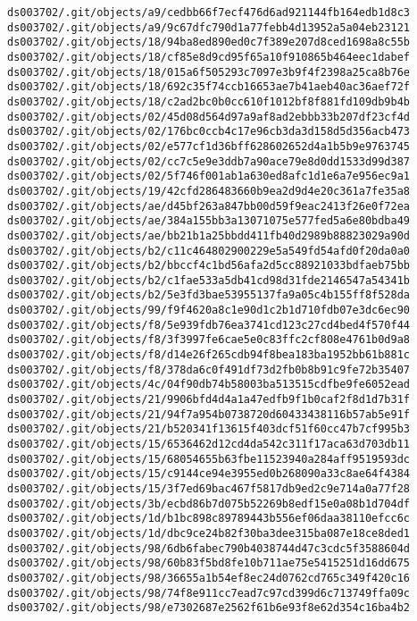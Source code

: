 \documentclass[11pt]{article}
\begin{document}
\begin{Verbatim}[commandchars=\\\{\}]
ds003702/.git/objects/a9/cedbb66f7ecf476d6ad921144fb164edb1d8c3
ds003702/.git/objects/a9/9c67dfc790d1a77febb4d13952a5a04eb23121
ds003702/.git/objects/18/94ba8ed890ed0c7f389e207d8ced1698a8c55b
ds003702/.git/objects/18/cf85e8d9cd95f65a10f910865b464eec1dabef
ds003702/.git/objects/18/015a6f505293c7097e3b9f4f2398a25ca8b76e
ds003702/.git/objects/18/692c35f74ccb16653ae7b41aeb40ac36aef72f
ds003702/.git/objects/18/c2ad2bc0b0cc610f1012bf8f881fd109db9b4b
ds003702/.git/objects/02/45d08d564d97a9af8ad2ebbb33b207df23cf4d
ds003702/.git/objects/02/176bc0ccb4c17e96cb3da3d158d5d356acb473
ds003702/.git/objects/02/e577cf1d36bff628602652d4a1b5b9e9763745
ds003702/.git/objects/02/cc7c5e9e3ddb7a90ace79e8d0dd1533d99d387
ds003702/.git/objects/02/5f746f001ab1a630ed8afc1d1e6a7e956ec9a1
ds003702/.git/objects/19/42cfd286483660b9ea2d9d4e20c361a7fe35a8
ds003702/.git/objects/ae/d45bf263a847bb00d59f9eac2413f26e0f72ea
ds003702/.git/objects/ae/384a155bb3a13071075e577fed5a6e80bdba49
ds003702/.git/objects/ae/bb21b1a25bbdd411fb40d2989b88823029a90d
ds003702/.git/objects/b2/c11c464802900229e5a549fd54afd0f20da0a0
ds003702/.git/objects/b2/bbccf4c1bd56afa2d5cc88921033bdfaeb75bb
ds003702/.git/objects/b2/c1fae533a5db41cd98d31fde2146547a54341b
ds003702/.git/objects/b2/5e3fd3bae53955137fa9a05c4b155ff8f528da
ds003702/.git/objects/99/f9f4620a8c1e90d1c2b1d710fdb07e3dc6ec90
ds003702/.git/objects/f8/5e939fdb76ea3741cd123c27cd4bed4f570f44
ds003702/.git/objects/f8/3f3997fe6cae5e0c83ffc2cf808e4761b0d9a8
ds003702/.git/objects/f8/d14e26f265cdb94f8bea183ba1952bb61b881c
ds003702/.git/objects/f8/378da6c0f491df73d2fb0b8b91c9fe72b35407
ds003702/.git/objects/4c/04f90db74b58003ba513515cdfbe9fe6052ead
ds003702/.git/objects/21/9906bfd4d4a1a47edfb9f1b0caf2f8d1d7b31f
ds003702/.git/objects/21/94f7a954b0738720d60433438116b57ab5e91f
ds003702/.git/objects/21/b520341f13615f403dcf51f60cc47b7cf995b3
ds003702/.git/objects/15/6536462d12cd4da542c311f17aca63d703db11
ds003702/.git/objects/15/68054655b63fbe11523940a284aff9519593dc
ds003702/.git/objects/15/c9144ce94e3955ed0b268090a33c8ae64f4384
ds003702/.git/objects/15/3f7ed69bac467f5817db9ed2c9e714a0a77f28
ds003702/.git/objects/3b/ecbd86b7d075b52269b8edf15e0a08b1d704df
ds003702/.git/objects/1d/b1bc898c89789443b556ef06daa38110efcc6c
ds003702/.git/objects/1d/dbc9ce24b82f30ba3dee315ba087e18ce8ded1
ds003702/.git/objects/98/6db6fabec790b4038744d47c3cdc5f3588604d
ds003702/.git/objects/98/60b83f5bd8fe10b711ae75e5415251d16dd675
ds003702/.git/objects/98/36655a1b54ef8ec24d0762cd765c349f420c16
ds003702/.git/objects/98/74f8e911cc7ead7c97cd399d6c713749ffa09c
ds003702/.git/objects/98/e7302687e2562f61b6e93f8e62d354c16ba4b2

\end{Verbatim}
\end{document}
